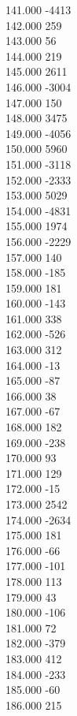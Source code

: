 { 141.000	-4413 \\
 142.000	259 \\
 143.000	56 \\
 144.000	219 \\
 145.000	2611 \\
 146.000	-3004 \\
 147.000	150 \\
 148.000	3475 \\
 149.000	-4056 \\
 150.000	5960 \\
 151.000	-3118 \\
 152.000	-2333 \\
 153.000	5029 \\
 154.000	-4831 \\
 155.000	1974 \\
 156.000	-2229 \\
 157.000	140 \\
 158.000	-185 \\
 159.000	181 \\
 160.000	-143 \\
 161.000	338 \\
 162.000	-526 \\
 163.000	312 \\
 164.000	-13 \\
 165.000	-87 \\
 166.000	38 \\
 167.000	-67 \\
 168.000	182 \\
 169.000	-238 \\
 170.000	93 \\
 171.000	129 \\
 172.000	-15 \\
 173.000	2542 \\
 174.000	-2634 \\
 175.000	181 \\
 176.000	-66 \\
 177.000	-101 \\
 178.000	113 \\
 179.000	43 \\
 180.000	-106 \\
 181.000	72 \\
 182.000	-379 \\
 183.000	412 \\
 184.000	-233 \\
 185.000	-60 \\
 186.000	215 \\
}
